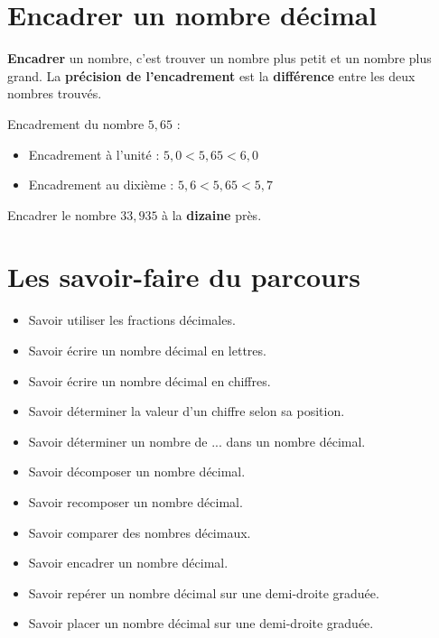 \documentclass[a4paper,dvipsnames]{article}
\begin{document}
\section{Encadrer un nombre décimal}

\begin{Def}
\textbf{Encadrer} un nombre, c'est trouver un nombre plus petit et un nombre plus grand. La \textbf{précision de l'encadrement} est la \textbf{différence} entre les deux nombres trouvés.
\end{Def}

\begin{Ex}
Encadrement du nombre $5,65$ :
 \begin{itemize}
\item Encadrement à l'unité : \(5,0 < 5,65< 6,0\)

\item Encadrement au dixième : \(5,6 < 5,65< 5,7\)
 \end{itemize}
\end{Ex}

\begin{ExOApp}[]
Encadrer le nombre $33,935$ à la \textbf{dizaine} près.
\end{ExOApp}

\section{Les savoir-faire du parcours}

\begin{CpsCol}
\begin{itemize}
\item Savoir utiliser les fractions décimales.
\item Savoir écrire un nombre décimal en lettres.
\item Savoir écrire un nombre décimal en chiffres.
\item Savoir déterminer la valeur d'un chiffre selon sa position.
\item Savoir déterminer un nombre de ... dans un nombre décimal.
\item Savoir décomposer un nombre décimal.
\item Savoir recomposer un nombre décimal.
\item Savoir comparer des nombres décimaux.
\item Savoir encadrer un nombre décimal.
\item Savoir repérer un nombre décimal sur une demi-droite graduée.
\item Savoir placer un nombre décimal sur une demi-droite graduée.
\end{itemize}
\end{CpsCol}
\end{document}
